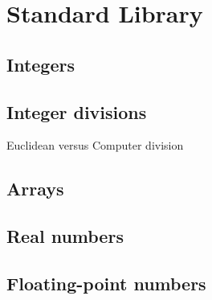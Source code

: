 \chapter{Standard Library}
\label{chap:library}

\section{Integers}
\label{theory:Int}

\section{Integer divisions}

Euclidean versus Computer division

\section{Arrays}

\section{Real numbers}

\section{Floating-point numbers}

\cite{ayad10ijcar}


